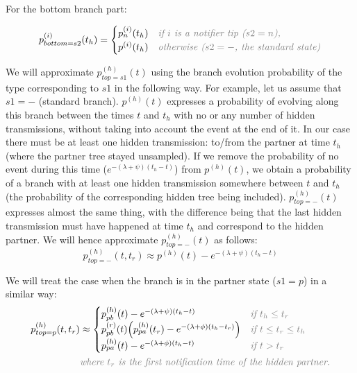 \documentclass[10pt,letterpaper]{article}
\begin{document}
For the bottom branch part: 

\begin{equation}
p_{bottom=s2}^{(i)}(t_h) = 
\begin{cases}
p_n^{(i)}(t_h)&\textit{\color{gray} if $i$ is a notifier tip ($s2=n$),}\\
p^{(i)}(t_h)&\textit{\color{gray} otherwise ($s2=-$, the standard state)}\\
\end{cases}
\end{equation}

We will approximate $p_{top=s1}^{(h)}(t)$ using the branch evolution probability of the type corresponding to $s1$  in the following way. For example, let us assume that $s1=-$ (standard branch). $p^{(h)}(t)$ expresses a probability of evolving along this branch between the times $t$ and $t_h$ with no or any number of hidden transmissions, without taking into account the event at the end of it. In our case there must be at least one hidden transmission: to/from the partner at time $t_h$ (where the partner tree stayed unsampled). If we remove the probability of no event during this time ($e^{-(\lambda + \psi)(t_h - t)}$) from $p^{(h)}(t)$, we  obtain a probability of a branch with at least one hidden transmission somewhere between $t$ and $t_h$ (the probability of the corresponding hidden tree being included). $p_{top=-}^{(h)}(t)$ expresses almost the same thing, with the difference being that the last hidden transmission must have happened at time $t_h$ and correspond to the hidden partner. %
We will hence approximate $p_{top=-}^{(h)}(t)$ as follows: 
\begin{equation}
p_{top=-}^{(h)}(t, t_r) \approx p^{(h)}(t) -e^{-(\lambda + \psi)(t_{h} - t)}
\end{equation}

We will treat the case when the branch is in the partner state ($s1=p$) in a similar way:
\begin{equation}
\begin{split}
p_{top=p}^{(h)}(t, t_r) &\approx 
\begin{cases}
p_{pb}^{(h)}(t) -e^{-(\lambda + \psi)(t_{h} - t)}&\textit{\color{gray} if $t_h \leq t_r$}\\
p_{pb}^{(r)}(t)\Big(p_{pa}^{(h)}(t_r) -e^{-(\lambda + \phi)(t_{h} - t_r)}\Big)&\textit{\color{gray} if $t \leq t_r \leq t_h$}\\
p_{pa}^{(h)}(t) -e^{-(\lambda + \phi)(t_{h} - t)}&\textit{\color{gray} if $t > t_r$}\\
\end{cases}\\
&\textit{\color{gray}where $t_r$ is the first notification time of the hidden partner.}\\
\end{split}
\end{equation}
\end{document}
